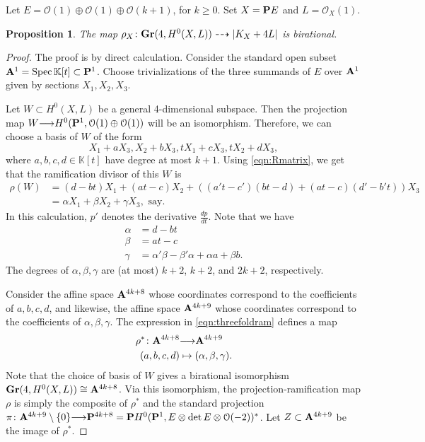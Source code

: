 \documentclass[11pt,reqno]{amsart}
\theoremstyle{plain}
\newtheorem{proposition}[theorem]{Proposition}
\theoremstyle{definition}
\theoremstyle{remark}
\numberwithin{equation}{section}
\renewcommand{\k}{\mathbb{K}}
\renewcommand{\to}{{\longrightarrow}}
\numberwithin{equation}{section}
\renewcommand{\O}{\mathcal O}
\begin{document}
Let $E = \O(1) \oplus \O(1) \oplus \O(k+1)$, for $k \geq 0$.
Set $X = \P E$ and $L = \O_X(1)$.
\begin{proposition}\label{prop:eccentric_threefold}
  The map $\rho_X \from \Gr(4, H^0(X, L)) \dashrightarrow |K_X + 4L|$ is birational.
\end{proposition}
\begin{proof}
  The proof is by direct calculation.
  Consider the standard open subset $\A^1 = \spec \k[t] \subset \P^1$.
  Choose trivializations of the three summands of $E$ over $\A^1$ given by sections $X_1, X_2, X_3$.
  
  Let $W \subset H^0(X, L)$ be a general 4-dimensional subspace.
  Then the projection map $W \to H^0(\P^1, \O(1) \oplus \O(1))$ will be an isomorphism.
  Therefore, we can choose a basis of $W$ of the form
  \[
    X_1 + aX_3, X_2 + bX_3, tX_1 + cX_3, tX_2 + d X_3,
  \]
  where $a, b, c, d \in \k[t]$ have degree at most $k+1$.
  Using \eqref{eqn:Rmatrix}, we get that the ramification divisor of this $W$ is
  \begin{equation}\label{eqn:threefoldram}
    \begin{split}
    \rho(W) &= (d-bt)X_1 + (at-c)X_2 + \left((a't-c')(bt-d) + (at-c)(d'-b't) \right) X_3 \\
    &= \alpha X_1 + \beta X_2 + \gamma X_3, \text{ say}.
  \end{split}
\end{equation}
  In this calculation, $p'$ denotes the derivative $\frac{dp}{dt}$.
  Note that we have
  \begin{equation}\label{eqn:alphabetagamma}
    \begin{split}
    \alpha &= d-bt\\
    \beta &= at-c\\
    \gamma &= \alpha'\beta - \beta'\alpha + \alpha a + \beta b.
    \end{split}
  \end{equation}
  The degrees of $\alpha, \beta, \gamma$ are (at most) $k+2$, $k+2$, and $2k+2$, respectively.

  Consider the affine space $\A^{4k+8}$ whose coordinates correspond to the coefficients of $a, b, c, d$, and likewise, the affine space $\A^{4k+9}$ whose coordinates correspond to the coefficients of $\alpha, \beta, \gamma$.
  The expression in \eqref{eqn:threefoldram} defines a map
  \begin{align*}
    \rho^* \from \A^{4k+8} &\to \A^{4k+9} \\
    (a,b,c,d) &\mapsto (\alpha, \beta, \gamma).
  \end{align*}
  Note that the choice of basis of $W$ gives a birational isomorphism $\Gr(4, H^0(X, L)) \cong \A^{4k+8}$.
  Via this isomorphism, the projection-ramification map $\rho$ is simply the composite of $\rho^*$ and the standard projection $\pi \from \A^{4k+9} \setminus \{0\} \to \P^{4k+8} = \P H^0(\P^1, E \otimes \det E \otimes \O(-2))^*$.
  Let $Z \subset \A^{4k+9}$ be the image of $\rho^*$.


\end{proof}
\end{document}
